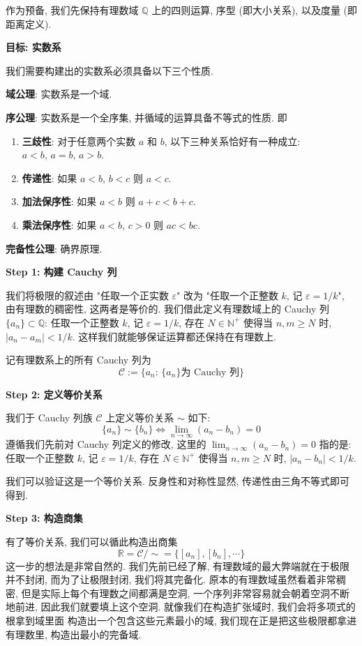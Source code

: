 \documentclass[UTF8]{book}
\begin{document}
作为预备, 我们先保持有理数域 $\mathbb{Q}$ 上的四则运算, 序型 (即大小关系), 
以及度量 (即距离定义). 

\noindent \textbf{目标: 实数系}

我们需要构建出的实数系必须具备以下三个性质.

\textbf{域公理}: 实数系是一个域. 

\textbf{序公理}: 实数系是一个全序集, 并循域的运算具备不等式的性质. 即
\begin{enumerate}
    \item \textbf{三歧性}: 对于任意两个实数 $a$ 和 $b$, 
    以下三种关系恰好有一种成立: $a<b,\,a=b,\,a>b$. 
    \item \textbf{传递性}: 如果 $a<b,\,b<c$ 则 $a<c$. 
    \item \textbf{加法保序性}: 如果 $a<b$ 则 $a+c<b+c$. 
    \item \textbf{乘法保序性}: 如果 $a<b,\,c>0$ 则 $ac<bc$. 
\end{enumerate}

\textbf{完备性公理}: 确界原理. 

\noindent \textbf{Step 1: 构建 Cauchy 列}

我们将极限的叙述由 "任取一个正实数 $\varepsilon$" 改为 
"任取一个正整数 $k$, 记 $\varepsilon = 1/k$", 由有理数的稠密性, 
这两者是等价的. 
我们借此定义有理数域上的 Cauchy 列 $\{a_n\}\subset \mathbb{Q}$: 
任取一个正整数 $k$, 记 $\varepsilon = 1/k$, 存在 $N \in \mathbb{N}^+$ 
使得当 $ n,m \geq N $ 时, $|a_n-a_m|<1/k$. 
这样我们就能够保证运算都还保持在有理数上. 

记有理数系上的所有 Cauchy 列为 $$\mathcal{C}:=\{{a_n}:\,\{a_n\}
\mbox{为 Cauchy 列}\} $$

\noindent \textbf{Step 2: 定义等价关系}

我们于 Cauchy 列族 $\mathcal{C}$ 上定义等价关系 $\sim$ 如下: 
$$ \{a_n\} \sim \{b_n\} \Leftrightarrow \lim_{n\to \infty}(a_n - b_n)= 0 $$
遵循我们先前对 Cauchy 列定义的修改, 这里的 $\lim_{n\to \infty}(a_n - b_n)= 0 $ 
指的是: 
任取一个正整数 $k$, 记 $\varepsilon = 1/k$, 存在 $N \in \mathbb{N}^+$ 
使得当 $ n,m \geq N $ 时, $|a_n-b_n|<1/k$. 

我们可以验证这是一个等价关系. 
反身性和对称性显然, 传递性由三角不等式即可得到. 

\noindent \textbf{Step 3: 构造商集}

有了等价关系, 我们可以循此构造出商集 
$$ \mathbb{R} = \mathcal{C}/\sim = \{[a_n],[b_n],\cdots\} $$
这一步的想法是非常自然的. 
我们先前已经了解, 有理数域的最大弊端就在于极限并不封闭, 
而为了让极限封闭, 我们将其完备化. 原本的有理数域虽然看着非常稠密, 
但是实际上每个有理数之间都满是空洞, 一个序列非常容易就会朝着空洞不断地前进, 
因此我们就要填上这个空洞. 就像我们在构造扩张域时, 我们会将多项式的根拿到域里面
构造出一个包含这些元素最小的域, 我们现在正是把这些极限都拿进有理数里, 
构造出最小的完备域. 
\end{document}
